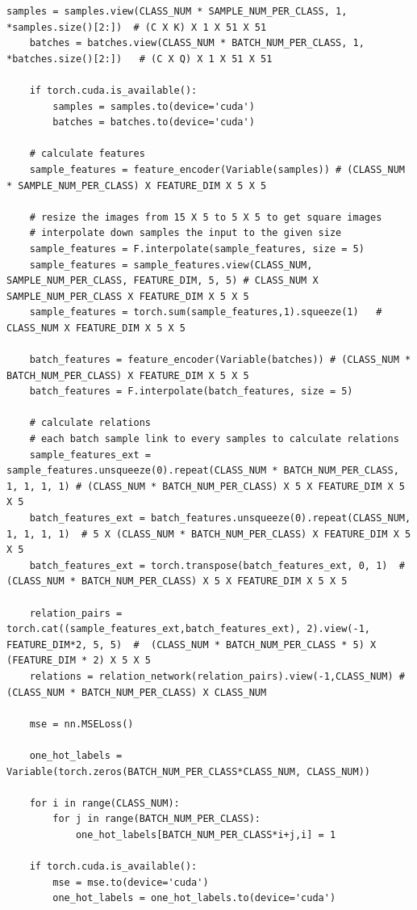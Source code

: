 \documentclass[12pt,a4paper,titlepage]{article}
\begin{document}
\begin{lstlisting}[language=iPython,firstnumber=1, caption=relation\_training.py, label=relation training,captionpos=b]
    samples = samples.view(CLASS_NUM * SAMPLE_NUM_PER_CLASS, 1, *samples.size()[2:])  # (C X K) X 1 X 51 X 51
    batches = batches.view(CLASS_NUM * BATCH_NUM_PER_CLASS, 1, *batches.size()[2:])   # (C X Q) X 1 X 51 X 51

    if torch.cuda.is_available():
        samples = samples.to(device='cuda')
        batches = batches.to(device='cuda')

    # calculate features
    sample_features = feature_encoder(Variable(samples)) # (CLASS_NUM * SAMPLE_NUM_PER_CLASS) X FEATURE_DIM X 5 X 5

    # resize the images from 15 X 5 to 5 X 5 to get square images
    # interpolate down samples the input to the given size
    sample_features = F.interpolate(sample_features, size = 5)
    sample_features = sample_features.view(CLASS_NUM, SAMPLE_NUM_PER_CLASS, FEATURE_DIM, 5, 5) # CLASS_NUM X SAMPLE_NUM_PER_CLASS X FEATURE_DIM X 5 X 5
    sample_features = torch.sum(sample_features,1).squeeze(1)   # CLASS_NUM X FEATURE_DIM X 5 X 5

    batch_features = feature_encoder(Variable(batches)) # (CLASS_NUM * BATCH_NUM_PER_CLASS) X FEATURE_DIM X 5 X 5
    batch_features = F.interpolate(batch_features, size = 5)

    # calculate relations
    # each batch sample link to every samples to calculate relations
    sample_features_ext = sample_features.unsqueeze(0).repeat(CLASS_NUM * BATCH_NUM_PER_CLASS, 1, 1, 1, 1) # (CLASS_NUM * BATCH_NUM_PER_CLASS) X 5 X FEATURE_DIM X 5 X 5
    batch_features_ext = batch_features.unsqueeze(0).repeat(CLASS_NUM, 1, 1, 1, 1)  # 5 X (CLASS_NUM * BATCH_NUM_PER_CLASS) X FEATURE_DIM X 5 X 5
    batch_features_ext = torch.transpose(batch_features_ext, 0, 1)  #  (CLASS_NUM * BATCH_NUM_PER_CLASS) X 5 X FEATURE_DIM X 5 X 5

    relation_pairs = torch.cat((sample_features_ext,batch_features_ext), 2).view(-1, FEATURE_DIM*2, 5, 5)  #  (CLASS_NUM * BATCH_NUM_PER_CLASS * 5) X (FEATURE_DIM * 2) X 5 X 5
    relations = relation_network(relation_pairs).view(-1,CLASS_NUM) #  (CLASS_NUM * BATCH_NUM_PER_CLASS) X CLASS_NUM

    mse = nn.MSELoss()
    
    one_hot_labels = Variable(torch.zeros(BATCH_NUM_PER_CLASS*CLASS_NUM, CLASS_NUM))

    for i in range(CLASS_NUM):
        for j in range(BATCH_NUM_PER_CLASS):
            one_hot_labels[BATCH_NUM_PER_CLASS*i+j,i] = 1

    if torch.cuda.is_available():
        mse = mse.to(device='cuda')
        one_hot_labels = one_hot_labels.to(device='cuda')


\end{lstlisting}
\end{document}

